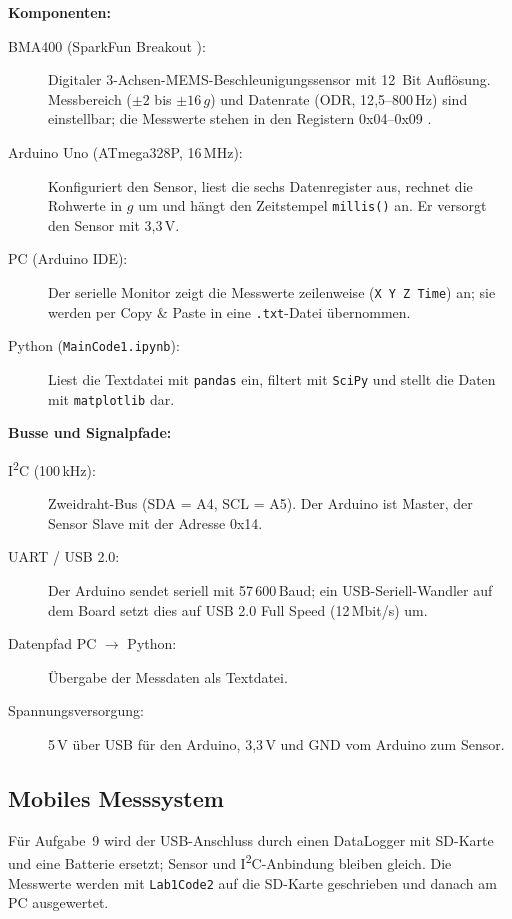 \documentclass[a4paper,oneside,10pt]{article}
\begin{document}
\textbf{Komponenten:}
\begin{description}
    \item[BMA400 (SparkFun Breakout \cite{sparkfun}):] Digitaler 3-Achsen-MEMS-Beschleunigungssensor mit
    12~Bit Auflösung. Messbereich ($\pm 2$ bis $\pm 16\,g$) und Datenrate (ODR, 12{,}5--800\,Hz)
    sind einstellbar; die Messwerte stehen in den Registern 0x04--0x09 \cite{bma400}.
    \item[Arduino Uno (ATmega328P, 16\,MHz):] Konfiguriert den Sensor, liest die sechs
    Datenregister aus, rechnet die Rohwerte in $g$ um und hängt den Zeitstempel
    \texttt{millis()} an. Er versorgt den Sensor mit 3{,}3\,V.
    \item[PC (Arduino IDE):] Der serielle Monitor zeigt die Messwerte zeilenweise
    (\texttt{X Y Z Time}) an; sie werden per Copy \& Paste in eine \texttt{.txt}-Datei
    übernommen.
    \item[Python (\texttt{MainCode1.ipynb}):] Liest die Textdatei mit \texttt{pandas} ein,
    filtert mit \texttt{SciPy} \cite{scipy} und stellt die Daten mit \texttt{matplotlib} dar.
\end{description}

\textbf{Busse und Signalpfade:}
\begin{description}
    \item[I\textsuperscript{2}C (100\,kHz):] Zweidraht-Bus (SDA = A4, SCL = A5). Der Arduino ist
    Master, der Sensor Slave mit der Adresse 0x14.
    \item[UART / USB 2.0:] Der Arduino sendet seriell mit 57\,600\,Baud; ein USB-Seriell-Wandler
    auf dem Board setzt dies auf USB 2.0 Full Speed (12\,Mbit/s) um.
    \item[Datenpfad PC $\rightarrow$ Python:] Übergabe der Messdaten als Textdatei.
    \item[Spannungsversorgung:] 5\,V über USB für den Arduino, 3{,}3\,V und GND vom Arduino
    zum Sensor.
\end{description}

\subsection{Mobiles Messsystem}

Für Aufgabe~9 wird der USB-Anschluss durch einen DataLogger mit SD-Karte und eine
Batterie ersetzt; Sensor und I\textsuperscript{2}C-Anbindung bleiben gleich. Die
Messwerte werden mit \texttt{Lab1Code2} auf die SD-Karte geschrieben und danach am PC
ausgewertet.
\end{document}
